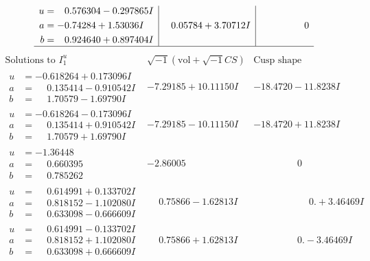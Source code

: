 \documentclass[1p]{elsarticle_modified}
\theoremstyle{definition}
\newcommand{\I}{\sqrt{-1}}
\begin{document}
$$\begin{array}{c|c|c}
\begin{aligned}
u &= \phantom{-}0.576304 - 0.297865 I \\
a &= -0.74284 + 1.53036 I \\
b &= \phantom{-}0.924640 + 0.897404 I\end{aligned}
 & \phantom{-}0.05784 + 3.70712 I & \phantom{-0.000000 } 0\\
 \hline 
 \end{array}$$\newpage$$\begin{array}{c|c|c}  
\text{Solutions to }I^u_{1}& \I (\text{vol} + \sqrt{-1}CS) & \text{Cusp shape}\\
 \hline 
\begin{aligned}
u &= -0.618264 + 0.173096 I \\
a &= \phantom{-}0.135414 - 0.910542 I \\
b &= \phantom{-}1.70579 - 1.69790 I\end{aligned}
 & -7.29185 + 10.11150 I & -18.4720 - 11.8238 I \\ \hline\begin{aligned}
u &= -0.618264 - 0.173096 I \\
a &= \phantom{-}0.135414 + 0.910542 I \\
b &= \phantom{-}1.70579 + 1.69790 I\end{aligned}
 & -7.29185 - 10.11150 I & -18.4720 + 11.8238 I \\ \hline\begin{aligned}
u &= -1.36448\phantom{ +0.000000I} \\
a &= \phantom{-}0.660395\phantom{ +0.000000I} \\
b &= \phantom{-}0.785262\phantom{ +0.000000I}\end{aligned}
 & -2.86005\phantom{ +0.000000I} & \phantom{-0.000000 } 0 \\ \hline\begin{aligned}
u &= \phantom{-}0.614991 + 0.133702 I \\
a &= \phantom{-}0.818152 - 1.102080 I \\
b &= \phantom{-}0.633098 - 0.666609 I\end{aligned}
 & \phantom{-}0.75866 - 1.62813 I & \phantom{-0.000000 -}0. + 3.46469 I \\ \hline\begin{aligned}
u &= \phantom{-}0.614991 - 0.133702 I \\
a &= \phantom{-}0.818152 + 1.102080 I \\
b &= \phantom{-}0.633098 + 0.666609 I\end{aligned}
 & \phantom{-}0.75866 + 1.62813 I & \phantom{-0.000000 } 0. - 3.46469 I \\ \hline\begin{aligned}

\end{aligned}
\end{array}$$
\end{document}
